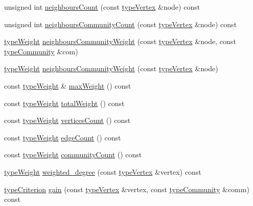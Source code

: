 \begin{DoxyCompactItemize}
\item 
unsigned int \hyperlink{classAlgorithmLouvain_ae0355167afc6ba8296f213469f6da4b0}{neighbours\+Count} (const \hyperlink{edge_8h_a5fbd20c46956d479cb10afc9855223f6}{type\+Vertex} \&node) const
\item 
unsigned int \hyperlink{classAlgorithmLouvain_a1d8b2b22ab5f49b08141696712baf337}{neighbours\+Community\+Count} (const \hyperlink{edge_8h_a5fbd20c46956d479cb10afc9855223f6}{type\+Vertex} \&node) const
\item 
\hyperlink{edge_8h_a2e7ea3be891ac8b52f749ec73fee6dd2}{type\+Weight} \hyperlink{classAlgorithmLouvain_a4f1160234f469ddc9205e4d1217478ac}{neighbours\+Community\+Weight} (const \hyperlink{edge_8h_a5fbd20c46956d479cb10afc9855223f6}{type\+Vertex} \&node, const \hyperlink{graphUndirectedGroupable_8h_a914da95c9ea7f14f4b7f875c36818556}{type\+Community} \&com)
\item 
\hyperlink{edge_8h_a2e7ea3be891ac8b52f749ec73fee6dd2}{type\+Weight} \hyperlink{classAlgorithmLouvain_afc30a152fabdd874d45a0728ada4ec6e}{neighbours\+Community\+Weight} (const \hyperlink{edge_8h_a5fbd20c46956d479cb10afc9855223f6}{type\+Vertex} \&node)
\item 
const \hyperlink{edge_8h_a2e7ea3be891ac8b52f749ec73fee6dd2}{type\+Weight} \& \hyperlink{classAlgorithmLouvain_a0b2ef33d5d1bf8b9aa2f8c73921844ac}{max\+Weight} () const
\item 
const \hyperlink{edge_8h_a2e7ea3be891ac8b52f749ec73fee6dd2}{type\+Weight} \hyperlink{classAlgorithmLouvain_a6b38d3b1af94bb426b953473aa5647a4}{total\+Weight} () const
\item 
const \hyperlink{edge_8h_a2e7ea3be891ac8b52f749ec73fee6dd2}{type\+Weight} \hyperlink{classAlgorithmLouvain_ab132e4f38f353713dc8c0c89b3bde576}{vertices\+Count} () const
\item 
const \hyperlink{edge_8h_a2e7ea3be891ac8b52f749ec73fee6dd2}{type\+Weight} \hyperlink{classAlgorithmLouvain_aa4b25143d94b4fabc830ea053b76dd7d}{edge\+Count} () const
\item 
const \hyperlink{edge_8h_a2e7ea3be891ac8b52f749ec73fee6dd2}{type\+Weight} \hyperlink{classAlgorithmLouvain_a8a8af8c837dd1a24a6be7904121edbbd}{community\+Count} () const
\item 
\hyperlink{edge_8h_a2e7ea3be891ac8b52f749ec73fee6dd2}{type\+Weight} \hyperlink{classAlgorithmLouvain_a75a05ca235819217d3a91c1bd45def43}{weighted\+\_\+degree} (const \hyperlink{edge_8h_a5fbd20c46956d479cb10afc9855223f6}{type\+Vertex} \&vertex) const
\item 
\hyperlink{criterionInterface_8h_af71ff22f6355fd69a4a62104bfd59a83}{type\+Criterion} \hyperlink{classAlgorithmLouvain_adcd4a8dc566881f9c1b1d9e78730a503}{gain} (const \hyperlink{edge_8h_a5fbd20c46956d479cb10afc9855223f6}{type\+Vertex} \&vertex, const \hyperlink{graphUndirectedGroupable_8h_a914da95c9ea7f14f4b7f875c36818556}{type\+Community} \&comm) const

\end{DoxyCompactItemize}
